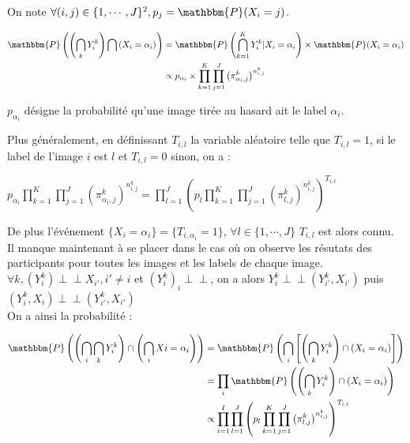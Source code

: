 \documentclass[frenchb]{report}
\newcommand{\1}{\mathbbm{1}}
\newcommand{\prob}{\mathbbm{P}}
\newcommand{\indep}{\perp \!\!\! \perp}
\theoremstyle{definition}\newtheorem{defn}{Définition}
\theoremstyle{definition}\newtheorem{exm}{Exemple}
\theoremstyle{definition}\newtheorem{nota}{Notation}
\theoremstyle{definition}\newtheorem{rem}{Remarque}
\begin{document}
On note $\forall (i,j) \in \{1, \cdots, J\}^2, p_j = \prob(X_i = j)$.

\begin{center}
	\begin{align*}
		\prob \left( \left( \displaystyle \bigcap_k Y^k_i \right) \bigcap \left(X_i = \alpha_i \right) \right) &= \prob \left( \displaystyle \bigcap_{k = 1}^K Y^k_i |X_i = \alpha_i \right) \times \prob(X_i = \alpha_i)\\
		& \propto p_{\alpha_i} \times \displaystyle \prod_{k=1}^K \displaystyle \prod_{j = 1}^J \left(\pi^k_{\alpha_i,j}\right)^{n^k_{i,j}}\\
	\end{align*}
\end{center}

$p_{\alpha_i}$ désigne la probabilité qu'une image tirée au hasard ait le label $\alpha_i$.

Plus généralement, en définissant $T_{i,l}$ la variable aléatoire telle que $T_{i,l} = 1$, si le label de l'image  $i$ est $l$ et $T_{i,l} = 0$ sinon, on a : \\

\begin{center}
	$p_{\alpha_i} \displaystyle \prod_{k=1}^K \displaystyle \prod_{j = 1}^J \left(\pi^k_{\alpha_i,j}\right)^{n^k_{i,j}} = \displaystyle \prod_{l=1}^J \left( p_l \displaystyle \prod_{k=1}^K \displaystyle \prod_{j = 1}^J \left(\pi^k_{l,j}\right)^{n^k_{i,j}} \right)^{T_{i,l}}$
\end{center}

De plus l'événement $\{X_i = \alpha_i \} = \{T_{i,\alpha_i} = 1\}$, $\forall l \in \{1, \cdots, J\}$ $T_{i,l}$ est alors connu.\\

Il manque maintenant à se placer dans le cas où on observe les résutats des participants pour toutes les images et les labels de chaque image.\\

$\forall k, (Y^k_i) \indep X_{i'}, i' \neq i$ et $(Y^k_i)_i \indep $, on a alors $Y^k_i \indep (Y^k_{i'},X_{i'})$ puis $(Y^k_i,X_i) \indep (Y^k_{i'},X_{i'})$\\
On a ainsi la probabilité : 

\begin{center}
	\begin{align*}
		\prob \left( \left( \displaystyle \bigcap_i \displaystyle \bigcap_k Y^k_i \right) \cap \left( \displaystyle \bigcap_i Xi = \alpha_i \right) \right) &= \prob \left( \displaystyle \bigcap_i \left[ \left( \displaystyle \bigcap_k Y^k_i \right) \cap \left(X_i = \alpha_i\right) \right] \right)\\
	&= \displaystyle \prod_i \prob \left( \left( \displaystyle \bigcap_k Y^k_i \right) \cap \left( X_i = \alpha_i \right) \right)\\
	&\propto \displaystyle \prod_{i=1}^I \displaystyle \prod_{l=1}^J \left( p_l \displaystyle \prod_{k=1}^K \displaystyle \prod_{j = 1}^J \left(\pi^k_{l,j}\right)^{n^k_{i,j}} \right)^{T_{i,l}}\\
	\end{align*}
\end{center}
\end{document}
